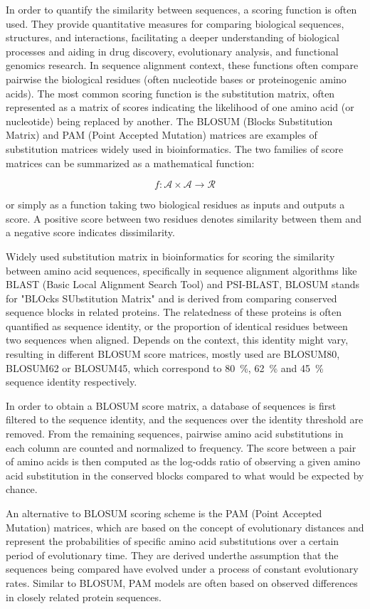 In order to quantify the similarity between sequences, a scoring function is often used. They provide quantitative measures for comparing biological sequences, structures, and interactions, facilitating a deeper understanding of biological processes and aiding in drug discovery, evolutionary analysis, and functional genomics research. In sequence alignment context, these functions often compare pairwise the biological residues (often nucleotide bases or proteinogenic amino acids). The most common scoring function is the substitution matrix, often represented as a matrix of scores indicating the likelihood of one amino acid (or nucleotide) being replaced by another. The BLOSUM (Blocks Substitution Matrix) and PAM (Point Accepted Mutation) matrices are examples of substitution matrices widely used in bioinformatics. The two families of score matrices can be summarized as a mathematical function:

$$f: \mathcal{A} \times \mathcal{A} \rightarrow \mathcal{R}$$

or simply as a function taking two biological residues as inputs and outputs a score. A positive score between two residues denotes similarity between them and a negative score indicates dissimilarity.

Widely used substitution matrix in bioinformatics for scoring the similarity between amino acid sequences, specifically in sequence alignment algorithms like BLAST (Basic Local Alignment Search Tool) and PSI-BLAST, BLOSUM stands for "BLOcks SUbstitution Matrix" and is derived from comparing conserved sequence blocks in related proteins. The relatedness of these proteins is often quantified as sequence identity, or the proportion of identical residues between two sequences when aligned. Depends on the context, this identity might vary, resulting in different BLOSUM score matrices, mostly used are BLOSUM80, BLOSUM62 or BLOSUM45, which correspond to 80~\%, 62~\% and 45~\% sequence identity respectively.

In order to obtain a BLOSUM score matrix, a database of sequences is first filtered to the sequence identity, and the sequences over the identity threshold are removed. From the remaining sequences,  pairwise amino acid substitutions in each column are counted and normalized to frequency. The score between a pair of amino acids is then computed as the log-odds ratio of observing a given amino acid substitution in the conserved blocks compared to what would be expected by chance.

An alternative to BLOSUM scoring scheme is the PAM (Point Accepted Mutation) matrices, which are based on the concept of evolutionary distances and represent the probabilities of specific amino acid substitutions over a certain period of evolutionary time. They are derived underthe assumption that the sequences being compared have evolved under a process of constant evolutionary rates. Similar to BLOSUM, PAM models are often based on observed differences in closely related protein sequences.

